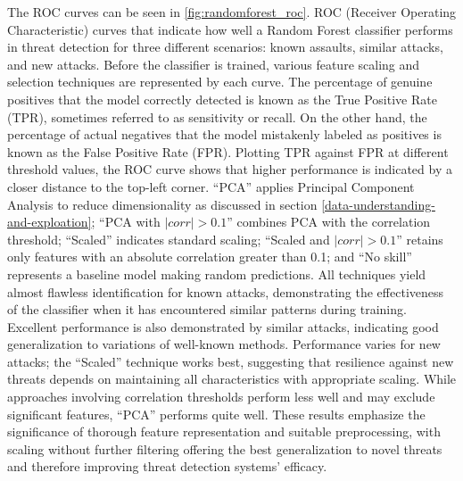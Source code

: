The ROC curves can be seen in \ref{fig:randomforest_roc}. ROC (Receiver Operating Characteristic) curves that indicate how well a Random Forest classifier performs in threat detection for three different scenarios: known assaults, similar attacks, and new attacks. Before the classifier is trained, various feature scaling and selection techniques are represented by each curve. The percentage of genuine positives that the model correctly detected is known as the True Positive Rate (TPR), sometimes referred to as sensitivity or recall. On the other hand, the percentage of actual negatives that the model mistakenly labeled as positives is known as the False Positive Rate (FPR). Plotting TPR against FPR at different threshold values, the ROC curve shows that higher performance is indicated by a closer distance to the top-left corner. ``PCA'' applies Principal Component Analysis to reduce dimensionality as discussed in section \ref{data-understanding-and-exploation}; ``PCA with $|corr|> 0.1$'' combines PCA with the correlation threshold; ``Scaled'' indicates standard scaling; ``Scaled and $|corr| > 0.1$'' retains only features with an absolute correlation greater than 0.1; and ``No skill'' represents a baseline model making random predictions. All techniques yield almost flawless identification for known attacks, demonstrating the effectiveness of the classifier when it has encountered similar patterns during training. Excellent performance is also demonstrated by similar attacks, indicating good generalization to variations of well-known methods. Performance varies for new attacks; the ``Scaled'' technique works best, suggesting that resilience against new threats depends on maintaining all characteristics with appropriate scaling. While approaches involving correlation thresholds perform less well and may exclude significant features, ``PCA'' performs quite well. These results emphasize the significance of thorough feature representation and suitable preprocessing, with scaling without further filtering offering the best generalization to novel threats and therefore improving threat detection systems' efficacy.

